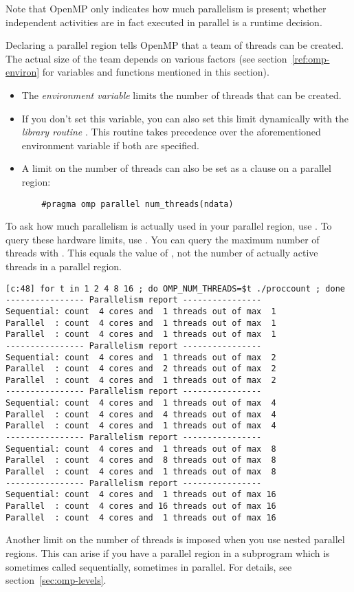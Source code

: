 Note that OpenMP only indicates how much parallelism is present;
whether independent activities are in fact executed in parallel
is a runtime decision.

Declaring a parallel region tells OpenMP that a team of threads can be created.
The actual size of the team depends on various factors (see section~\ref{ref:omp-environ}
for variables and functions mentioned in this section).
\begin{itemize}
\item The \emph{environment variable}
   limits the number of
  threads that can be created.
\item If you don't set this variable, you can also set this limit
  dynamically with the \emph{library routine} . This routine takes
  precedence over the aforementioned environment variable if both are
  specified.
\item A limit on the number of threads can also be set as a
   clause on a parallel region:
  \begin{lstlisting}
    #pragma omp parallel num_threads(ndata)
  \end{lstlisting}
\end{itemize}

To ask how much parallelism is actually used in your parallel region,
use . To query these hardware limits,
use .
You can query the maximum number of threads with .
This equals the value of ,
not the number of actually active threads in a parallel region.

\begin{multicols}{2}
  \columnbreak
\tiny
\begin{verbatim}
[c:48] for t in 1 2 4 8 16 ; do OMP_NUM_THREADS=$t ./proccount ; done
---------------- Parallelism report ----------------
Sequential: count  4 cores and  1 threads out of max  1
Parallel  : count  4 cores and  1 threads out of max  1
Parallel  : count  4 cores and  1 threads out of max  1
---------------- Parallelism report ----------------
Sequential: count  4 cores and  1 threads out of max  2
Parallel  : count  4 cores and  2 threads out of max  2
Parallel  : count  4 cores and  1 threads out of max  2
---------------- Parallelism report ----------------
Sequential: count  4 cores and  1 threads out of max  4
Parallel  : count  4 cores and  4 threads out of max  4
Parallel  : count  4 cores and  1 threads out of max  4
---------------- Parallelism report ----------------
Sequential: count  4 cores and  1 threads out of max  8
Parallel  : count  4 cores and  8 threads out of max  8
Parallel  : count  4 cores and  1 threads out of max  8
---------------- Parallelism report ----------------
Sequential: count  4 cores and  1 threads out of max 16
Parallel  : count  4 cores and 16 threads out of max 16
Parallel  : count  4 cores and  1 threads out of max 16
\end{verbatim}
\end{multicols}

Another limit on the number of threads is imposed when you use nested parallel regions.
This can arise if you have a parallel region in a subprogram which is sometimes called
sequentially, sometimes in parallel.
For details, see section~\ref{sec:omp-levels}.


